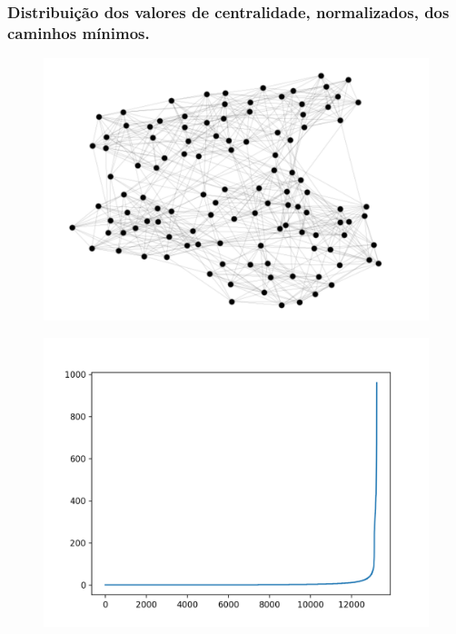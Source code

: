 \documentclass{beamer}
\begin{document}
        \begin{frame}
            \frametitle{Distribuição dos valores de centralidade, normalizados, dos caminhos mínimos.}
            \begin{minipage}{\textwidth}
                \begin{minipage}[b]{0.49\textwidth}
                    \begin{figure}
                        \centering
                        \includegraphics[scale=0.25]{american-football.png}
                    \end{figure}
                \end{minipage}
                \hfill
                \begin{minipage}[b]{0.49\textwidth}
                    \begin{figure}
                        \centering
                        \includegraphics[scale=0.3]{short_path_centrality_ex3.png}
                    \end{figure}
                \end{minipage}
            \end{minipage}
        \end{frame}
\end{document}
